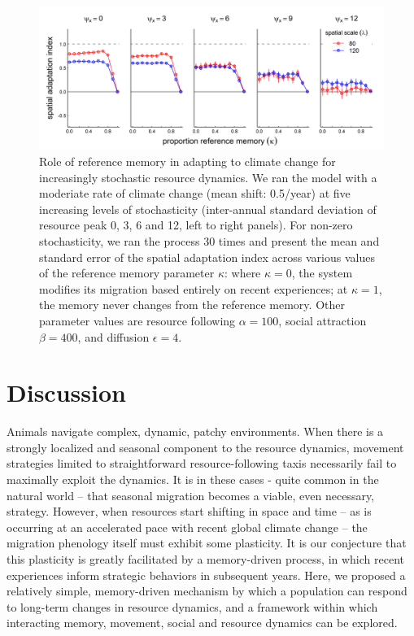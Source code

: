 \documentclass[utf8]{frontiersSCNS} %
\begin{document}
\begin{figure}
	
	\includegraphics[width=\textwidth]{figures/TrendStochasticity.png}
	
	\caption{ \label{fig_trendstochasticity} Role of reference memory in adapting to climate change for increasingly stochastic resource dynamics. We ran the model with a moderiate rate of climate change (mean shift: 0.5/year) at five increasing levels of stochasticity (inter-annual standard deviation of resource peak 0, 3, 6 and 12, left to right panels). For non-zero stochasticity, we ran the process 30 times and present the mean and standard error of the spatial adaptation index across various values of the reference memory parameter $\kappa$: where $\kappa = 0$, the system modifies its migration based entirely on recent experiences; at $\kappa = 1$, the memory never changes from the reference memory. Other parameter values are resource following $\alpha = 100$, social attraction $\beta = 400$, and diffusion $\epsilon = 4$.}
	
\end{figure}

\section{Discussion}

Animals navigate complex, dynamic, patchy environments. When there is a strongly localized and seasonal component to the resource dynamics, movement strategies limited to straightforward resource-following taxis necessarily fail to maximally exploit the dynamics. It is in these cases - quite common in the natural world -- that seasonal migration becomes a viable, even necessary, strategy. However, when resources start shifting in space and time -- as is occurring at an accelerated pace with recent global climate change -- the migration phenology itself must exhibit some plasticity. It is our conjecture that this plasticity is greatly facilitated by a memory-driven process, in which recent experiences inform strategic behaviors in subsequent years. Here, we proposed a relatively simple, memory-driven mechanism by which a population can respond to long-term changes in resource dynamics, and a framework within which interacting memory, movement, social and resource dynamics can be explored.
\end{document}
